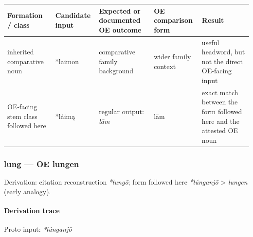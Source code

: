 \documentclass[
  british,
  a4paper,
]{article}
\newcounter{none} %
\begin{document}
{\def\LTcaptype{none} %
\begin{longtable}[]{@{}
  >{\raggedright\arraybackslash}p{}
  >{\raggedright\arraybackslash}p{}
  >{\raggedright\arraybackslash}p{}
  >{\raggedright\arraybackslash}p{}
  >{\raggedright\arraybackslash}p{}@{}}
\toprule\noalign{}
\begin{minipage}[b]{\linewidth}\raggedright
Formation / class
\end{minipage} & \begin{minipage}[b]{\linewidth}\raggedright
Candidate input
\end{minipage} & \begin{minipage}[b]{\linewidth}\raggedright
Expected or documented OE outcome
\end{minipage} & \begin{minipage}[b]{\linewidth}\raggedright
OE comparison form
\end{minipage} & \begin{minipage}[b]{\linewidth}\raggedright
Result
\end{minipage} \\
\midrule\noalign{}
\endhead
\bottomrule\noalign{}
\endlastfoot
inherited comparative noun & *laimōn & comparative family background &
wider family context & useful headword, but not the direct OE-facing
input \\
OE-facing stem class followed here & *láimą & regular output: \emph{lām}
& lām & exact match between the form followed here and the attested OE
noun \\
\end{longtable}
}

\subsubsection{lung --- OE lungen}\label{lung-oe-lungen}

Derivation: citation reconstruction \emph{*lungō}; form followed here
\emph{*lúnganjō} \textgreater{} \emph{lungen} (early analogy).

\paragraph{Derivation trace}\label{derivation-trace-18}

Proto input: \emph{*lúnganjō}
\end{document}
